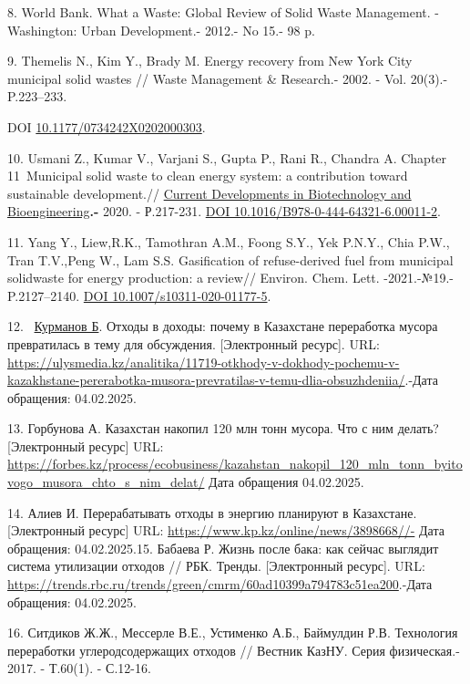 8. World Bank. What a Waste: Global Review of Solid Waste Management.
-Washington: Urban Development.- 2012.- No 15.- 98 p.

9. Themelis N., Kim Y., Brady M. Energy recovery from New York City
municipal solid wastes // Waste Management \& Research.- 2002. - Vol.
20(3).- P.223--233.

DOI
\href{http://dx.doi.org/10.1177/0734242X0202000303}{10.1177/0734242X0202000303}.

10. Usmani Z., Kumar V., Varjani S., Gupta P., Rani R., Chandra A.
Chapter 11~Municipal solid waste to clean energy system: a
contribution toward sustainable development.//
\href{https://www.sciencedirect.com/book/9780444643216/current-developments-in-biotechnology-and-bioengineering}{Current
Developments in Biotechnology and Bioengineering}{\bfseries .-} 2020. -
Р.217-231. \href{https://doi.org/10.1016/B978-0-444-64321-6.00011-2}{DOI
10.1016/B978-0-444-64321-6.00011-2}.

11. Yang Y., Liew,R.K., Tamothran A.M., Foong S.Y., Yek P.N.Y., Chia
P.W., Tran T.V.,Peng W., Lam S.S. Gasification of refuse-derived fuel
from municipal solidwaste for energy production: a review// Environ.
Chem. Lett. -2021.-№19.- P.2127--2140.
\href{https://doi.org/10.1007/s10311-020-01177-5}{DOI
10.1007/s10311-020-01177-5}.

12. ~\href{https://ulysmedia.kz/author/21/}{Курманов Б}. Отходы в
доходы: почему в Казахстане переработка мусора превратилась в тему для
обсуждения. {[}Электронный ресурс{]}. URL:
\url{https://ulysmedia.kz/analitika/11719-otkhody-v-dokhody-pochemu-v-kazakhstane-pererabotka-musora-prevratilas-v-temu-dlia-obsuzhdeniia/}.-Дата
обращения: 04.02.2025.

13. Горбунова А. Казахстан накопил 120 млн тонн мусора. Что с ним
делать? {[}Электронный ресурс{]} URL:
\url{https://forbes.kz/process/ecobusiness/kazahstan_nakopil_120_mln_tonn_byitovogo_musora_chto_s_nim_delat/}
Дата обращения 04.02.2025.

14. Алиев И. Перерабатывать отходы в энергию планируют в Казахстане.
{[}Электронный ресурс{]} URL:
\url{https://www.kp.kz/online/news/3898668//-} Дата обращения:
04.02.2025.15. Бабаева Р. Жизнь после бака: как сейчас выглядит система утилизации
отходов // РБК. Тренды. {[}Электронный ресурс{]}. URL:
\url{https://trends.rbc.ru/trends/green/cmrm/60ad10399a794783c51ea200}.-Дата
обращения: 04.02.2025.

16. Ситдиков Ж.Ж., Мессерле В.Е., Устименко А.Б., Баймулдин Р.В.
Технология переработки углеродсодержащих отходов // Вестник КазНУ. Серия
физическая.- 2017. - Т.60(1). - С.12-16.

